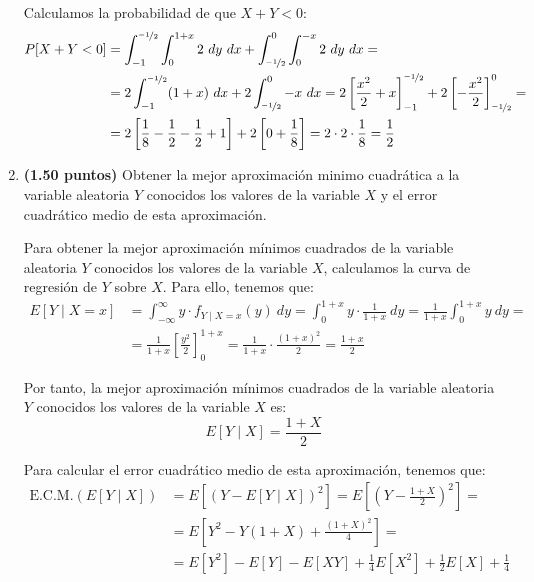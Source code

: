 \documentclass[12pt]{article}
\begin{document}
\begin{ejercicio}[5 puntos]
\begin{enumerate}
            Calculamos la probabilidad de que $X+Y<0$:
            \begin{align*}
                P[X+Y<0] &= \int_{-1}^{\nicefrac{-1}{2}}\int_{0}^{1+x} 2 \ dy \ dx + \int_{\nicefrac{-1}{2}}^{0}\int_{0}^{-x} 2 \ dy \ dx
                =\\&= 2\int_{-1}^{\nicefrac{-1}{2}} (1+x) \ dx + 2\int_{\nicefrac{-1}{2}}^{0} -x \ dx
                = 2\left[\frac{x^2}{2}+x\right]_{-1}^{\nicefrac{-1}{2}} + 2\left[-\frac{x^2}{2}\right]_{\nicefrac{-1}{2}}^{0}
                =\\&= 2\left[\frac{1}{8}-\frac{1}{2}-\frac{1}{2}+1\right] + 2\left[0+\frac{1}{8}\right]
                = 2\cdot 2\cdot \frac{1}{8} = \frac{1}{2}
            \end{align*}
            \item \textbf{(1.50 puntos)} Obtener la mejor aproximación minimo cuadrática a la variable aleatoria $Y$ conocidos los valores de la variable $X$ y el error cuadrático medio de esta aproximación.
            
            Para obtener la mejor aproximación mínimos cuadrados de la variable aleatoria $Y$ conocidos los valores de la variable $X$, calculamos la curva de regresión de $Y$ sobre $X$. Para ello, tenemos que:
            \begin{align*}
                E[Y\mid X=x] &= \int_{-\infty}^{\infty} y\cdot f_{Y\mid X=x}(y) \ dy
                = \int_{0}^{1+x} y\cdot \frac{1}{1+x} \ dy
                = \frac{1}{1+x}\int_{0}^{1+x} y \ dy
                =\\&= \frac{1}{1+x}\left[\frac{y^2}{2}\right]_{0}^{1+x}
                = \frac{1}{1+x}\cdot \frac{(1+x)^2}{2}
                = \frac{1+x}{2}
            \end{align*}

            Por tanto, la mejor aproximación mínimos cuadrados de la variable aleatoria $Y$ conocidos los valores de la variable $X$ es:
            \begin{equation*}
                E[Y\mid X] = \frac{1+X}{2}
            \end{equation*}

            Para calcular el error cuadrático medio de esta aproximación, tenemos que:
            \begin{align*}
                \text{E.C.M.}(E[Y\mid X]) &= E[(Y-E[Y\mid X])^2]
                = E\left[\left(Y-\frac{1+X}{2}\right)^2\right]
                =\\&= E\left[Y^2 - Y(1+X) + \frac{(1+X)^2}{4}\right]
                =\\&= E[Y^2] - E[Y]-E[XY] + \frac{1}{4}E[X^2] + \frac{1}{2}E[X] + \frac{1}{4}
            \end{align*}


\end{enumerate}
\end{ejercicio}
\end{document}
